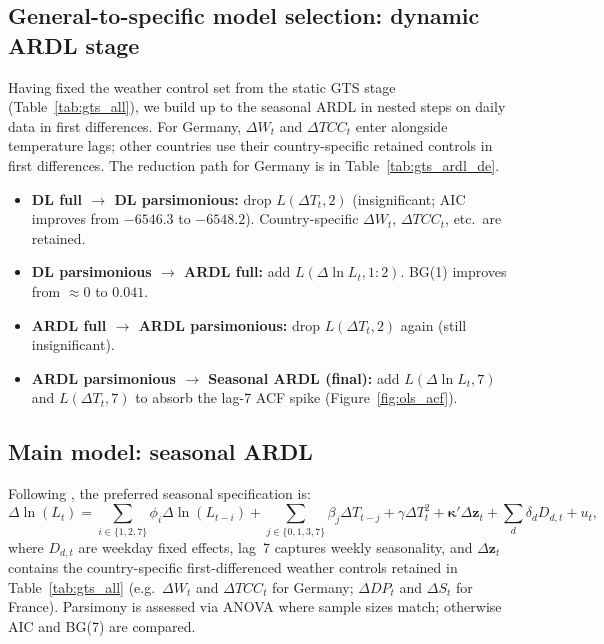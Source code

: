 \documentclass[12pt,a4paper]{article}
\begin{document}
\begin{table}[H]
  \centering
  \caption{Baseline OLS diagnostic tests (focus countries)}
  \label{tab:baseline_diag}
  \small
  
\end{table}

\subsection{General-to-specific model selection: dynamic ARDL stage}
\label{sec:gts_ardl}

Having fixed the weather control set from the static GTS stage (Table~\ref{tab:gts_all}), we build up to the seasonal ARDL in nested steps on daily data in first differences. For Germany, $\Delta W_t$ and $\Delta\mathit{TCC}_t$ enter alongside temperature lags; other countries use their country-specific retained controls in first differences. The reduction path for Germany is in Table~\ref{tab:gts_ardl_de}.

\begin{itemize}
  \item \textbf{DL full $\to$ DL parsimonious:} drop $L(\Delta T_t, 2)$ (insignificant; AIC improves from $-6546.3$ to $-6548.2$). Country-specific $\Delta W_t$, $\Delta\mathit{TCC}_t$, etc.\ are retained.
  \item \textbf{DL parsimonious $\to$ ARDL full:} add $L(\Delta\ln L_t, 1{:}2)$. BG(1) improves from $\approx 0$ to $0.041$.
  \item \textbf{ARDL full $\to$ ARDL parsimonious:} drop $L(\Delta T_t, 2)$ again (still insignificant).
  \item \textbf{ARDL parsimonious $\to$ Seasonal ARDL (final):} add $L(\Delta\ln L_t, 7)$ and $L(\Delta T_t, 7)$ to absorb the lag-7 ACF spike (Figure~\ref{fig:ols_acf}).
\end{itemize}

\begin{table}[H]
  \centering
  \caption{General-to-specific ARDL reduction --- Germany}
  \label{tab:gts_ardl_de}
  \small
  
\end{table}

\subsection{Main model: seasonal ARDL}
\label{sec:ardl}

Following \citet{pesaran1997}, the preferred seasonal specification is:
\begin{equation}
  \Delta \ln(L_t) = \sum_{i \in \{1,2,7\}} \phi_i \Delta \ln(L_{t-i})
  + \sum_{j \in \{0,1,3,7\}} \beta_j \Delta T_{t-j}
  + \gamma \Delta T_t^2
  + \boldsymbol{\kappa}'\Delta\mathbf{z}_t
  + \sum_d \delta_d D_{d,t}
  + u_t,
  \label{eq:ardl}
\end{equation}
where $D_{d,t}$ are weekday fixed effects, lag~7 captures weekly seasonality, and $\Delta\mathbf{z}_t$ contains the country-specific first-differenced weather controls retained in Table~\ref{tab:gts_all} (e.g.\ $\Delta W_t$ and $\Delta\mathit{TCC}_t$ for Germany; $\Delta\mathit{DP}_t$ and $\Delta S_t$ for France). Parsimony is assessed via ANOVA where sample sizes match; otherwise AIC and BG(7) are compared.
\end{document}
